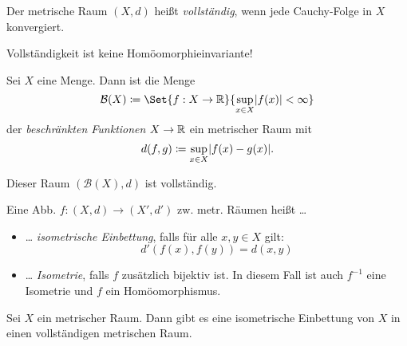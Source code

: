 \documentclass{cheat-sheet}
\begin{document}
\begin{defn}
  Der metrische Raum $(X, d)$ heißt \emph{vollständig}, wenn jede Cauchy-Folge in $X$ konvergiert.
\end{defn}


\begin{acht}
  Vollständigkeit ist keine Homöomorphieinvariante!
\end{acht}

\begin{defn}
  Sei $X$ eine Menge. Dann ist die Menge
  \[ \mathcal{B}(X) \coloneqq \Set{ f : X \to \R }{ \sup_{x \in X} \abs{f(x)} < \infty } \]
  der \emph{beschränkten Funktionen} $X \to \mathbb{R}$ ein metrischer Raum mit
  \[ d(f, g) \coloneqq \sup_{x \in X} \lvert f(x) - g(x)\rvert. \]
\end{defn}

\begin{prop}
  Dieser Raum $(\mathcal{B}(X), d)$ ist vollständig.
\end{prop}

\begin{defn}
  Eine Abb. $f : (X, d) \to (X', d')$ zw. metr. Räumen heißt \ldots
  \begin{itemize}
    \item \ldots{} \emph{isometrische Einbettung}, falls für alle $x , y \in X$ gilt:
    \[ d'(f(x), f(y)) = d(x, y) \]
    \item \ldots{} \emph{Isometrie}, falls $f$ zusätzlich bijektiv ist. In diesem Fall ist auch $f^{-1}$ eine Isometrie und $f$ ein Homöomorphismus.
  \end{itemize}
\end{defn}

\begin{prop}
  Sei $X$ ein metrischer Raum. Dann gibt es eine isometrische Einbettung von $X$ in einen vollständigen metrischen Raum.
\end{prop}
\end{document}
